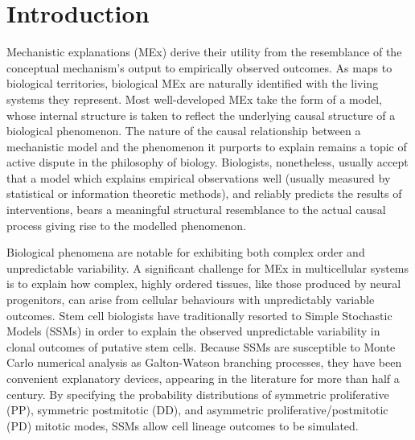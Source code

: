 \documentclass[10pt,letterpaper]{article}
\begin{document}

\linenumbers


\section*{Introduction}

Mechanistic explanations (MEx) derive their utility from the resemblance of the conceptual mechanism's output to empirically observed outcomes. As maps to biological territories, biological MEx are naturally identified with the living systems they represent. Most well-developed MEx take the form of a model, whose internal structure is taken to reflect the underlying causal structure of a biological phenomenon. The nature of the causal relationship between a mechanistic model and the phenomenon it purports to explain remains a topic of active dispute in the philosophy of biology\cite{Fagan2015}. Biologists, nonetheless, usually accept that a model which explains empirical observations well (usually measured by statistical or information theoretic methods), and reliably predicts the results of interventions, bears a meaningful structural resemblance to the actual causal process giving rise to the modelled phenomenon.

Biological phenomena are notable for exhibiting both complex order and unpredictable variability. A significant challenge for MEx in multicellular systems is to explain how complex, highly ordered tissues, like those produced by neural progenitors, can arise from cellular behaviours with unpredictably variable outcomes. Stem cell biologists have traditionally resorted to Simple Stochastic Models (SSMs) in order to explain the observed unpredictable variability in clonal outcomes of putative stem cells\cite{Till1964,Fagan2013}. Because SSMs are susceptible to Monte Carlo numerical analysis as Galton-Watson branching processes, they have been convenient explanatory devices, appearing in the literature for more than half a century. By specifying the probability distributions of symmetric proliferative (PP), symmetric postmitotic (DD), and asymmetric proliferative/postmitotic (PD) mitotic modes, SSMs allow cell lineage outcomes to be simulated.
\end{document}
